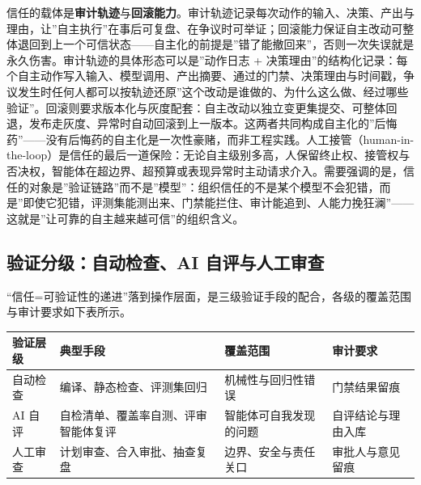 \documentclass[12pt,a4paper,twoside,openany]{ctexbook}
\numberwithin{figure}{chapter}
\numberwithin{table}{chapter}
\newcounter{none}
\begin{document}
信任的载体是\textbf{审计轨迹}与\textbf{回滚能力}。审计轨迹记录每次动作的输入、决策、产出与理由，让''自主执行''在事后可复盘、在争议时可举证；回滚能力保证自主改动可整体退回到上一个可信状态------自主化的前提是''错了能撤回来''，否则一次失误就是永久伤害。审计轨迹的具体形态可以是''动作日志
+
决策理由''的结构化记录：每个自主动作写入输入、模型调用、产出摘要、通过的门禁、决策理由与时间戳，争议发生时任何人都可以按轨迹还原''这个改动是谁做的、为什么这么做、经过哪些验证''。回滚则要求版本化与灰度配套：自主改动以独立变更集提交、可整体回退，发布走灰度、异常时自动回滚到上一版本。这两者共同构成自主化的''后悔药''------没有后悔药的自主化是一次性豪赌，而非工程实践。人工接管（human-in-the-loop）是信任的最后一道保险：无论自主级别多高，人保留终止权、接管权与否决权，智能体在超边界、超预算或表现异常时主动请求介入。需要强调的是，信任的对象是''验证链路''而不是''模型''：组织信任的不是某个模型不会犯错，而是''即使它犯错，评测集能测出来、门禁能拦住、审计能追到、人能力挽狂澜''------这就是''让可靠的自主越来越可信''的组织含义。

\subsection{验证分级：自动检查、AI
自评与人工审查}\label{ux9a8cux8bc1ux5206ux7ea7ux81eaux52a8ux68c0ux67e5ai-ux81eaux8bc4ux4e0eux4ebaux5de5ux5ba1ux67e5}

``信任=可验证性的递进''落到操作层面，是三级验证手段的配合，各级的覆盖范围与审计要求如下表所示。

{\def\LTcaptype{none} %
\begin{longtable}[]{@{}
  >{\raggedright\arraybackslash}p{}
  >{\raggedright\arraybackslash}p{}
  >{\raggedright\arraybackslash}p{}
  >{\raggedright\arraybackslash}p{}@{}}
\toprule\noalign{}
\begin{minipage}[b]{\linewidth}\raggedright
验证层级
\end{minipage} & \begin{minipage}[b]{\linewidth}\raggedright
典型手段
\end{minipage} & \begin{minipage}[b]{\linewidth}\raggedright
覆盖范围
\end{minipage} & \begin{minipage}[b]{\linewidth}\raggedright
审计要求
\end{minipage} \\
\midrule\noalign{}
\endhead
\bottomrule\noalign{}
\endlastfoot
自动检查 & 编译、静态检查、评测集回归 & 机械性与回归性错误 &
门禁结果留痕 \\
AI 自评 & 自检清单、覆盖率自测、评审智能体复评 & 智能体可自我发现的问题
& 自评结论与理由入库 \\
人工审查 & 计划审查、合入审批、抽查复盘 & 边界、安全与责任关口 &
审批人与意见留痕 \\
\end{longtable}
}
\end{document}

